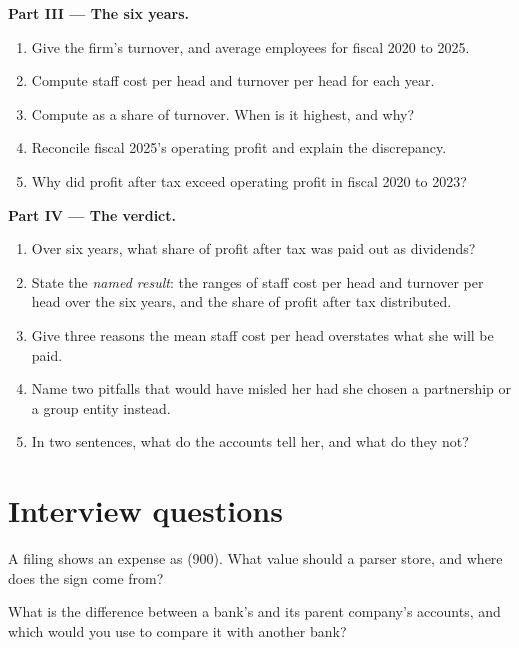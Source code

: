 \begin{problem}
\medskip\noindent\textbf{Part III --- The six years.}
\begin{enumerate}[resume]
\item Give the firm's turnover,  and average employees for fiscal 2020 to 2025.
\item Compute staff cost per head and turnover per head for each year.
\item Compute  as a share of turnover. When is it highest, and why?
\item Reconcile fiscal 2025's operating profit and explain the discrepancy.
\item Why did profit after tax exceed operating profit in fiscal 2020 to 2023?
\end{enumerate}

\medskip\noindent\textbf{Part IV --- The verdict.}
\begin{enumerate}[resume]
\item Over six years, what share of profit after tax was paid out as dividends?
\item State the \emph{named result}: the ranges of staff cost per head and turnover per head over the six years, and
the share of profit after tax distributed.
\item Give three reasons the mean staff cost per head overstates what she will be paid.
\item Name two pitfalls that would have misled her had she chosen a partnership or a group entity instead.
\item In two sentences, what do the accounts tell her, and what do they not?
\end{enumerate}
\end{problem}

\section{Interview questions}

\begin{interviewq}\label{iq:in:reading-a-trading-firms-accounts:1}
A filing shows an expense as (900). What value should a parser store, and where does the sign come from?
\end{interviewq}

\begin{interviewq}\label{iq:in:reading-a-trading-firms-accounts:2}
What is the difference between a bank's  and its parent company's accounts, and which would you
use to compare it with another bank?
\end{interviewq}

